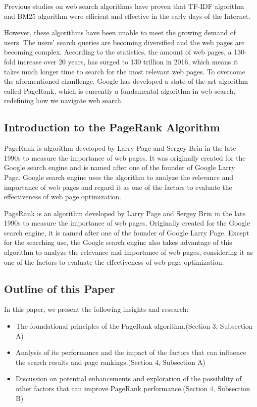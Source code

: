\documentclass[lettersize,journal,12pt]{IEEEtran}
\begin{document}
Previous studies on web search algorithms have proven that TF-IDF algorithm and BM25 algorithm were efficient and effective in the early days of the Internet.

However, these algorithms have been unable to meet the growing demand of users.
The users' search queries are becoming diversified and the web pages are becoming complex.
According to the statistics, the amount of web pages, a 130-fold increase over 20 years, has surged to 130 trillion in 2016, which means it takes much longer time to search for the most relevant web pages.
To overcome the aformentioned chanllenge, Google has developed a state-of-the-art algorithm called PageRank, which is currently a fundamental algorithm in web search, redefining how we navigate web search.

\subsection{Introduction to the PageRank Algorithm}
PageRank is algorithm developed by Larry Page and Sergey Brin in the late 1990s to measure the importance of web pages.
It was originally created for the Google search engine and is named after one of the founder of Google Larry Page.
Google search engine uses the algorithm to analyze the relevance and importance of web pages and regard it as one of the factors to evaluate the effectiveness of web page optimization.

PageRank is an algorithm developed by Larry Page and Sergey Brin in the late 1990s to measure the importance of web pages.
Originally created for the Google search engine, it is named after one of the founder of Google Larry Page. Except for the searching use, the Google search engine also takes advantage of this algorithm to analyze the relevance and importance of web pages, considering it as one of the factors to evaluate the effectiveness of web page optimization.

\subsection{Outline of this Paper}

In this paper, we present the following insights and research:
\begin{itemize}
	\item The foundational principles of the PageRank algorithm.(Section 3, Subsection A)
	\item Analysis of its performance and the impact of the factors that can influence the search results and page rankings.(Section 4, Subsection A)
	\item Discussion on potential enhancements and exploration of the possibility of other factors that can improve PageRank performance.(Section 4, Subsection B)
\end{itemize}
\end{document}
